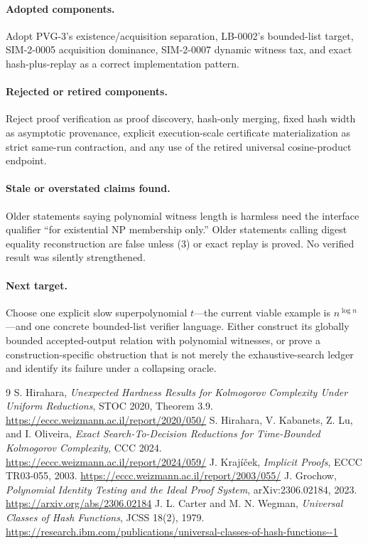 \documentclass[11pt]{article}
\begin{document}
\paragraph{Adopted components.}
Adopt PVG-3's existence/acquisition separation, LB-0002's bounded-list
target, SIM-2-0005 acquisition dominance, SIM-2-0007 dynamic witness tax,
and exact hash-plus-replay as a correct implementation pattern.

\paragraph{Rejected or retired components.}
Reject proof verification as proof discovery, hash-only merging, fixed hash
width as asymptotic provenance, explicit execution-scale certificate
materialization as strict same-run contraction, and any use of the retired
universal cosine-product endpoint.

\paragraph{Stale or overstated claims found.}
Older statements saying polynomial witness length is harmless need the
interface qualifier ``for existential NP membership only.''  Older
statements calling digest equality reconstruction are false unless (3) or
exact replay is proved.  No verified result was silently strengthened.

\paragraph{Next target.}
Choose one explicit slow superpolynomial $t$---the current viable example is
$n^{\log n}$---and one concrete bounded-list verifier language.  Either
construct its globally bounded accepted-output relation with polynomial
witnesses, or prove a construction-specific obstruction that is not merely
the exhaustive-search ledger and identify its failure under a collapsing
oracle.

\begin{thebibliography}{9}
 S. Hirahara, \emph{Unexpected Hardness Results for
Kolmogorov Complexity Under Uniform Reductions}, STOC 2020, Theorem 3.9.
\url{https://eccc.weizmann.ac.il/report/2020/050/}
 S. Hirahara, V. Kabanets, Z. Lu, and I. Oliveira,
\emph{Exact Search-To-Decision Reductions for Time-Bounded Kolmogorov
Complexity}, CCC 2024.
\url{https://eccc.weizmann.ac.il/report/2024/059/}
 J. Kraj\'i\v cek, \emph{Implicit Proofs}, ECCC
TR03-055, 2003. \url{https://eccc.weizmann.ac.il/report/2003/055/}
 J. Grochow, \emph{Polynomial Identity Testing and the
Ideal Proof System}, arXiv:2306.02184, 2023.
\url{https://arxiv.org/abs/2306.02184}
 J. L. Carter and M. N. Wegman,
\emph{Universal Classes of Hash Functions}, JCSS 18(2), 1979.
\url{https://research.ibm.com/publications/universal-classes-of-hash-functions--1}
\end{thebibliography}
\end{document}
